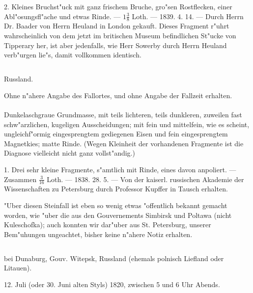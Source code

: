 \documentclass[a4paper, 11pt, oneside, polutonikogreek, german]{article}
\begin{document}
2. Kleines Bruchst"uck mit ganz frischem Bruche, gro"sen Rostflecken, einer Abl"osungsfl"ache und etwas Rinde. --- $\mathfrak{1\frac{3}{8}}$ Loth. --- 1839. 4. 14. --- Durch Herrn Dr. Baader von Herrn Heuland in London gekauft. Dieses Fragment r"uhrt wahrscheinlich von dem jetzt im britischen Museum befindlichen St"ucke von Tipperary her, ist aber jedenfalls, wie Herr Sowerby durch Herrn Heuland verb"urgen lie"s, damit vollkommen identisch.
\subsection{}
\begin{center}

Russland.

Ohne n"ahere Angabe des Fallortes, und ohne Angabe der Fallzeit erhalten.
\end{center}
\paragraph{}
Dunkelaschgraue Grundmasse, mit teils lichteren, teils dunkleren, zuweilen fast schw"arzlichen, kugeligen Ausscheidungen; mit fein und mittelfein, wie es scheint, ungleichf"ormig eingesprengtem gediegenen Eisen und fein eingesprengtem Magnetkies; matte Rinde. (Wegen Kleinheit der vorhandenen Fragmente ist die Diagnose vielleicht nicht ganz vollst"andig.)

1. Drei sehr kleine Fragmente, s"amtlich mit Rinde, eines davon anpoliert. --- Zusammen $\mathfrak{\frac{3}{16}}$ Loth. --- 1838. 28. 5. --- Von der kaiserl. russischen Akademie der Wissenschaften zu Petersburg durch Professor Kupffer in Tausch erhalten.

\setlength{\leftskip}{10mm}
\setlength{\parindent}{0pt}

{\footnotesize "Uber diesen Steinfall ist eben so wenig etwas "offentlich bekannt gemacht worden, wie "uber die aus den Gouvernements Simbirsk und Poltawa (nicht Kuleschofka); auch konnten wir dar"uber aus St. Petersburg, unserer Bem"uhungen ungeachtet, bisher keine n"ahere Notiz erhalten.}

\setlength{\leftskip}{0pt}
\setlength{\parindent}{20pt}

\subsection[\swabfamily {Lixna.}]{}
\begin{center}

bei Dunaburg, Gouv. Witepsk, Russland (ehemals polnisch Liefland oder Litauen).

12. Juli (oder 30. Juni alten Styls) 1820, zwischen 5 und 6 Uhr Abends.
\end{center}
\end{document}

